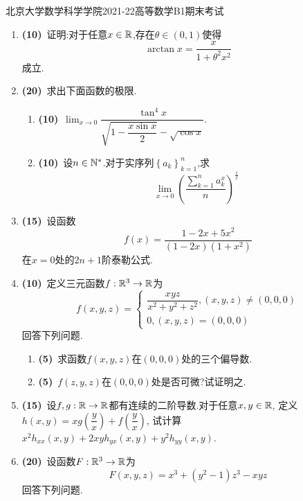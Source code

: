 \documentclass{ctexart}
\begin{document}
\pagestyle{empty}

\begin{center}\Large
    北京大学数学科学学院2021-22高等数学B1期末考试
\end{center}
\begin{enumerate}[leftmargin=*,label=\textbf{\arabic*.}]
    \item \textbf{(10)}\ 证明:对于任意$x\in\mathbb{R}$,存在$\theta\in(0,1)$使得
        \[\arctan x=\dfrac{x}{1+\theta^2x^2}\]
        成立.
    \item \textbf{(20)}\ 求出下面函数的极限.
        \begin{enumerate}[label=\textbf{(\arabic*)},leftmargin=*]
            \item \textbf{(10)}\ $\displaystyle\lim_{x\to0}\dfrac{\tan^4x}{\sqrt{1-\dfrac{x\sin x}{2}}-\sqrt{\cos x}}$.
            \item \textbf{(10)}\ 设$n\in\mathbb{N}^*$.对于实序列$\left\{a_k\right\}_{k=1}^n$,求\[\lim_{x\to0}\left(\dfrac{\sum_{k=1}^na_k^x}{n}\right)^{\frac{1}{x}}\]
        \end{enumerate}
    \item \textbf{(15)}\ 设函数\[f(x)=\dfrac{1-2x+5x^2}{(1-2x)(1+x^2)}\]在$x=0$处的$2n+1$阶泰勒公式.
    \item \textbf{(10)}\ 定义三元函数$f:\mathbb{R}^3\to\mathbb{R}$为\[f(x,y,z)=\left\{\begin{array}{l}
            \dfrac{xyz}{x^2+y^2+z^2},(x,y,z)\neq(0,0,0)\\
            0,(x,y,z)=(0,0,0)
        \end{array}\right.\]回答下列问题.
        \begin{enumerate}[label=\textbf{(\arabic*)},leftmargin=*]
            \item \textbf{(5)}\ 求函数$f(x,y,z)$在$(0,0,0)$处的三个偏导数.
            \item \textbf{(5)}\ $f(z,y,z)$在$(0,0,0)$处是否可微?试证明之.
        \end{enumerate}
    \item \textbf{(15)}\ 设$f,g:\mathbb{R}\to\mathbb{R}$都有连续的二阶导数.对于任意$x,y\in\mathbb{R}$,
        定义$h(x,y)=xg\left(\dfrac{y}{x}\right)+f\left(\dfrac{y}{x}\right)$,
        试计算$x^2h_{xx}(x,y)+2xyh_{yx}(x,y)+y^2h_{yy}(x,y)$.
    \item \textbf{(20)}\ 设函数$F:\mathbb{R}^3\to\mathbb{R}$为\[F(x,y,z)=x^3+(y^2-1)z^3-xyz\]回答下列问题.
        \begin{enumerate}[label=\textbf{(\arabic*)},leftmargin=*]

\end{enumerate}
\end{enumerate}
\end{document}
